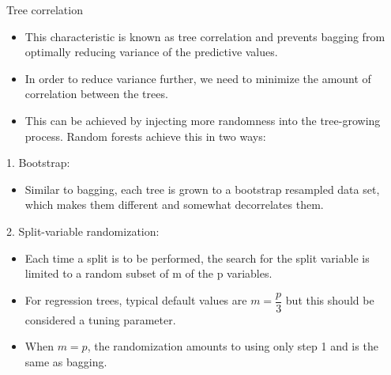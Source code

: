 \documentclass[
  10pt,
  ignorenonframetext,
]{beamer}
\providecommand{\tightlist}{%
  \setlength{\itemsep}{0pt}\setlength{\parskip}{0pt}}
\begin{document}
\begin{frame}{Tree correlation}
\protect\hypertarget{tree-correlation}{}

\begin{itemize}
\tightlist
\item
  This characteristic is known as tree correlation and prevents bagging
  from optimally reducing variance of the predictive values.
\item
  In order to reduce variance further, we need to minimize the amount of
  correlation between the trees.
\item
  This can be achieved by injecting more randomness into the
  tree-growing process. Random forests achieve this in two ways:
\end{itemize}

\begin{block}{1. Bootstrap:}

\begin{itemize}
\tightlist
\item
  Similar to bagging, each tree is grown to a bootstrap resampled data
  set, which makes them different and somewhat decorrelates them.
\end{itemize}

\end{block}

\begin{block}{2. Split-variable randomization:}

\begin{itemize}
\tightlist
\item
  Each time a split is to be performed, the search for the split
  variable is limited to a random subset of m of the p variables.
\item
  For regression trees, typical default values are \(m=\dfrac{p}{3}\)
  but this should be considered a tuning parameter.
\item
  When \(m=p\), the randomization amounts to using only step 1 and is
  the same as bagging.
\end{itemize}

\end{block}

\end{frame}
\end{document}
